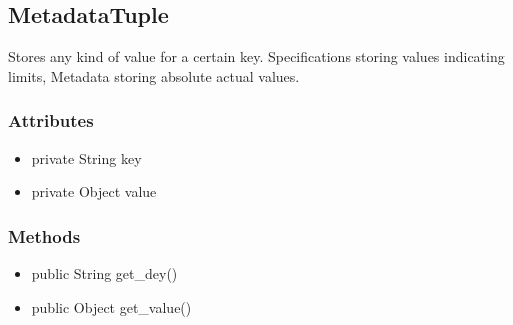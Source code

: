 \subsection{MetadataTuple}
Stores any kind of value for a certain key. Specifications storing values indicating limits, Metadata storing absolute actual values.

\subsubsection{Attributes}
\begin{itemize}
	\item private String key
	\item private Object value
\end{itemize}
\subsubsection{Methods}
\begin{itemize}
	\item public String get\_dey()
	\item public Object get\_value()
\end{itemize}